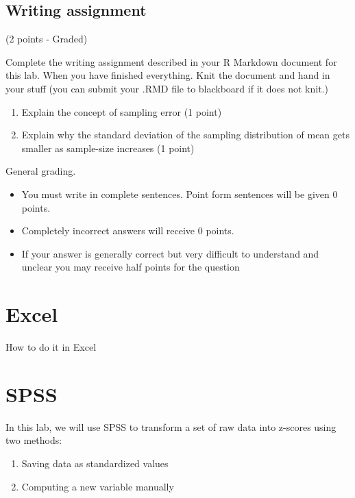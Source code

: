 \documentclass[]{book}
\providecommand{\tightlist}{%
  \setlength{\itemsep}{0pt}\setlength{\parskip}{0pt}}
\begin{document}
\subsection{Writing assignment}\label{writing-assignment-3}

(2 points - Graded)

Complete the writing assignment described in your R Markdown document
for this lab. When you have finished everything. Knit the document and
hand in your stuff (you can submit your .RMD file to blackboard if it
does not knit.)

\begin{enumerate}
\def\labelenumi{\arabic{enumi}.}
\item
  Explain the concept of sampling error (1 point)
\item
  Explain why the standard deviation of the sampling distribution of
  mean gets smaller as sample-size increases (1 point)
\end{enumerate}

General grading.

\begin{itemize}
\tightlist
\item
  You must write in complete sentences. Point form sentences will be
  given 0 points.
\item
  Completely incorrect answers will receive 0 points.
\item
  If your answer is generally correct but very difficult to understand
  and unclear you may receive half points for the question
\end{itemize}

\section{Excel}\label{excel-4}

How to do it in Excel

\section{SPSS}\label{spss-4}

In this lab, we will use SPSS to transform a set of raw data into
z-scores using two methods:

\begin{enumerate}
\def\labelenumi{\arabic{enumi}.}
\tightlist
\item
  Saving data as standardized values
\item
  Computing a new variable manually
\end{enumerate}
\end{document}
